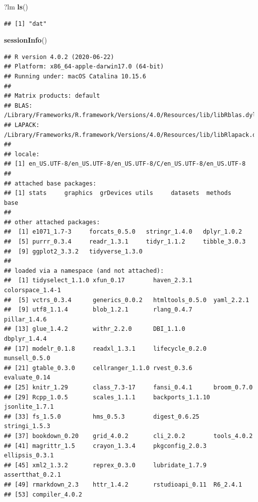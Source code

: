 \documentclass[
]{book}
\newenvironment{Shaded}{\begin{snugshade}}{\end{snugshade}}
\newcommand{\KeywordTok}[1]{\textcolor[rgb]{0.13,0.29,0.53}{\textbf{#1}}}
\newcommand{\NormalTok}[1]{#1}
\begin{document}
\begin{Shaded}
\begin{Highlighting}[]
\NormalTok{?lm}
\KeywordTok{ls}\NormalTok{()}
\end{Highlighting}
\end{Shaded}

\begin{verbatim}
## [1] "dat"
\end{verbatim}

\begin{Shaded}
\begin{Highlighting}[]
\KeywordTok{sessionInfo}\NormalTok{()}
\end{Highlighting}
\end{Shaded}

\begin{verbatim}
## R version 4.0.2 (2020-06-22)
## Platform: x86_64-apple-darwin17.0 (64-bit)
## Running under: macOS Catalina 10.15.6
## 
## Matrix products: default
## BLAS:   /Library/Frameworks/R.framework/Versions/4.0/Resources/lib/libRblas.dylib
## LAPACK: /Library/Frameworks/R.framework/Versions/4.0/Resources/lib/libRlapack.dylib
## 
## locale:
## [1] en_US.UTF-8/en_US.UTF-8/en_US.UTF-8/C/en_US.UTF-8/en_US.UTF-8
## 
## attached base packages:
## [1] stats     graphics  grDevices utils     datasets  methods   base     
## 
## other attached packages:
##  [1] e1071_1.7-3     forcats_0.5.0   stringr_1.4.0   dplyr_1.0.2    
##  [5] purrr_0.3.4     readr_1.3.1     tidyr_1.1.2     tibble_3.0.3   
##  [9] ggplot2_3.3.2   tidyverse_1.3.0
## 
## loaded via a namespace (and not attached):
##  [1] tidyselect_1.1.0 xfun_0.17        haven_2.3.1      colorspace_1.4-1
##  [5] vctrs_0.3.4      generics_0.0.2   htmltools_0.5.0  yaml_2.2.1      
##  [9] utf8_1.1.4       blob_1.2.1       rlang_0.4.7      pillar_1.4.6    
## [13] glue_1.4.2       withr_2.2.0      DBI_1.1.0        dbplyr_1.4.4    
## [17] modelr_0.1.8     readxl_1.3.1     lifecycle_0.2.0  munsell_0.5.0   
## [21] gtable_0.3.0     cellranger_1.1.0 rvest_0.3.6      evaluate_0.14   
## [25] knitr_1.29       class_7.3-17     fansi_0.4.1      broom_0.7.0     
## [29] Rcpp_1.0.5       scales_1.1.1     backports_1.1.10 jsonlite_1.7.1  
## [33] fs_1.5.0         hms_0.5.3        digest_0.6.25    stringi_1.5.3   
## [37] bookdown_0.20    grid_4.0.2       cli_2.0.2        tools_4.0.2     
## [41] magrittr_1.5     crayon_1.3.4     pkgconfig_2.0.3  ellipsis_0.3.1  
## [45] xml2_1.3.2       reprex_0.3.0     lubridate_1.7.9  assertthat_0.2.1
## [49] rmarkdown_2.3    httr_1.4.2       rstudioapi_0.11  R6_2.4.1        
## [53] compiler_4.0.2
\end{verbatim}
\end{document}
